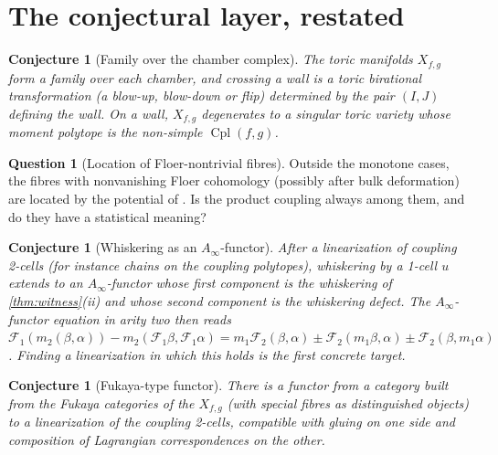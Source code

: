 \documentclass[11pt]{article}
\newtheorem{conjecture}[theorem]{Conjecture}
\theoremstyle{definition}
\newtheorem{question}[theorem]{Question}
\theoremstyle{remark}
\newcommand{\Cpl}{\operatorname{Cpl}}
\begin{document}
\section{The conjectural layer, restated}\label{sec:conjectural}

\begin{conjecture}[Family over the chamber complex]\label{conj:family}
The toric manifolds $X_{f,g}$ form a family over each chamber, and crossing a wall is a toric
birational transformation (a blow-up, blow-down or flip) determined by the pair $(I,J)$ defining the
wall. On a wall, $X_{f,g}$ degenerates to a singular toric variety whose moment polytope is the
non-simple $\Cpl(f,g)$.
\end{conjecture}

\begin{question}[Location of Floer-nontrivial fibres]\label{q:location}
Outside the monotone cases, the fibres with nonvanishing Floer cohomology (possibly after bulk
deformation) are located by the potential of \cite{FOOO2010}. Is the product coupling always among
them, and do they have a statistical meaning?
\end{question}

\begin{conjecture}[Whiskering as an $A_\infty$-functor]\label{conj:ainfty}
After a linearization of coupling 2-cells (for instance chains on the coupling polytopes), whiskering by
a 1-cell $u$ extends to an $A_\infty$-functor whose first component is the whiskering of
\cref{thm:witness}(ii) and whose second component is the whiskering defect. The $A_\infty$-functor
equation in arity two then reads
$\mathcal{F}_1(m_2(\beta,\alpha))-m_2(\mathcal{F}_1\beta,\mathcal{F}_1\alpha)=
m_1\mathcal{F}_2(\beta,\alpha)\pm\mathcal{F}_2(m_1\beta,\alpha)\pm\mathcal{F}_2(\beta,m_1\alpha)$.
Finding a linearization in which this holds is the first concrete target.
\end{conjecture}

\begin{conjecture}[Fukaya-type functor]\label{conj:fukaya}
There is a functor from a category built from the Fukaya categories of the $X_{f,g}$ (with special
fibres as distinguished objects) to a linearization of the coupling 2-cells, compatible with gluing on
one side and composition of Lagrangian correspondences on the other.
\end{conjecture}
\end{document}
